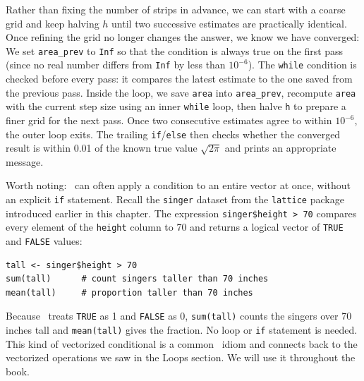 Rather than fixing the number of strips in advance, we can start with a coarse
grid and keep halving $h$ until two successive estimates are practically
identical. Once refining the grid no longer changes the answer, we know we
have converged:
We set \lstinline{area_prev} to \lstinline{Inf}  so that the
condition is always true on the first pass (since no real number differs from
\lstinline{Inf} by less than $10^{-6}$). The \lstinline{while} condition
 is checked before every pass: it compares the latest estimate
to the one saved from the previous pass. Inside the loop, we save
\lstinline{area} into \lstinline{area_prev}, recompute \lstinline{area} with
the current step size using an inner \lstinline{while} loop, then halve
\lstinline{h}  to prepare a finer grid for the next pass. Once
two consecutive estimates agree to within $10^{-6}$, the outer loop exits.
The trailing \lstinline{if}/\lstinline{else}  then checks whether
the converged result is within 0.01 of the known true value $\sqrt{2\pi}$
and prints an appropriate message.

Worth noting: \R\ can often apply a condition to an entire vector at once,
without an explicit \lstinline{if} statement. Recall the \lstinline{singer}
dataset from the \lstinline{lattice} package introduced earlier in this
chapter. The expression \lstinline{singer$height > 70} compares every
element of the \lstinline{height} column to 70 and returns a logical vector
of \lstinline{TRUE} and \lstinline{FALSE} values:
\begin{lstlisting}
tall <- singer$height > 70
sum(tall)      # count singers taller than 70 inches
mean(tall)     # proportion taller than 70 inches
\end{lstlisting}
Because \R\ treats \lstinline{TRUE} as 1 and \lstinline{FALSE} as 0,
\lstinline{sum(tall)} counts the singers over 70 inches tall and
\lstinline{mean(tall)} gives the fraction. No loop or \lstinline{if}
statement is needed. This kind of vectorized conditional is a common \R\
idiom and connects back to the vectorized
operations we saw in the Loops section. We will use it throughout the book.


